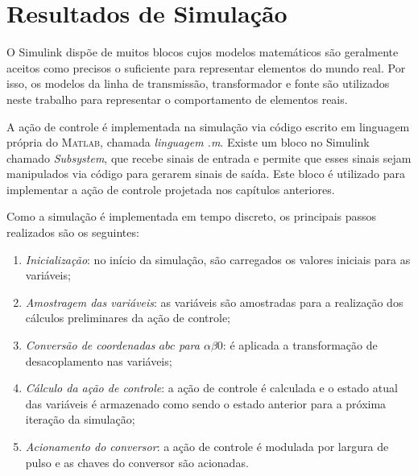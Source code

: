 \section{Resultados de Simulação}


  O Simulink dispõe de muitos blocos cujos modelos matemáticos são geralmente aceitos como precisos o suficiente para representar elementos do mundo real. Por isso, os modelos da linha de transmissão, transformador e fonte são utilizados neste trabalho para representar o comportamento de elementos reais.

	A ação de controle é implementada na simulação via código escrito em linguagem própria do \textsc{Matlab}, chamada \textit{linguagem .m}. Existe um bloco no Simulink chamado \textit{Subsystem}, que recebe sinais de entrada e permite que esses sinais sejam manipulados via código para gerarem sinais de saída. Este bloco é utilizado para implementar a ação de controle projetada nos capítulos anteriores.

	Como a simulação é implementada em tempo discreto, os principais passos realizados são os seguintes:
	\begin{enumerate}
		\item \textit{Inicialização}: no início da simulação, são carregados os valores iniciais para as variáveis;
		\item \textit{Amostragem das variáveis}: as variáveis são amostradas para a realização dos cálculos preliminares da ação de controle;
    \item \textit{Conversão de coordenadas $abc$ para $\alpha \beta 0$}: é aplicada a transformação de desacoplamento nas variáveis;
		\item \textit{Cálculo da ação de controle}: a ação de controle é calculada e o estado atual das variáveis é armazenado como sendo o estado anterior para a próxima iteração da simulação;
    \item \textit{Acionamento do conversor}: a ação de controle é modulada por largura de pulso e as chaves do conversor são acionadas.
	\end{enumerate}

